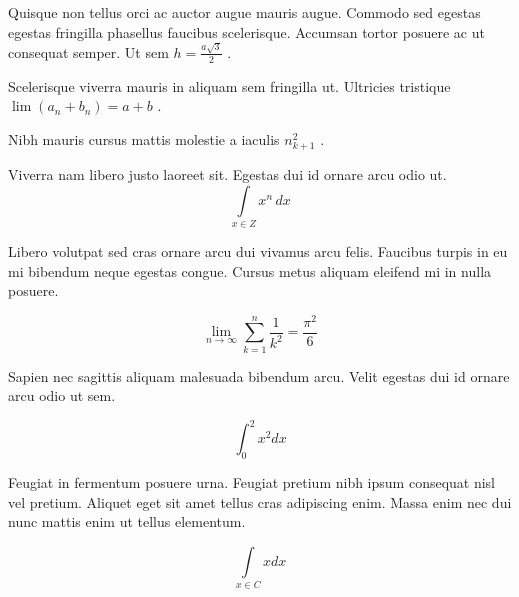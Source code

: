 \documentclass{article}
\begin{document}
Quisque non tellus orci ac auctor augue mauris augue. Commodo sed egestas egestas fringilla phasellus faucibus scelerisque. Accumsan tortor posuere ac ut consequat semper. Ut sem 
\begin{math}
	h=\frac{a\sqrt{3}}{2}
\end{math}
.\newline

Scelerisque viverra mauris in aliquam sem fringilla ut. Ultricies tristique 
$ \lim\left ( a_n+b_n \right )=a+b $
.\newline


Nibh mauris cursus mattis molestie a iaculis 
\( n_{k+1}^2 \)
.\newline

Viverra nam libero justo laoreet sit. Egestas dui id ornare arcu odio ut.
\[ \int\limits_{x\in Z}\! x^{n}\, dx \]

Libero volutpat sed cras ornare arcu dui vivamus arcu felis. Faucibus turpis in eu mi bibendum neque egestas congue. Cursus metus aliquam eleifend mi in nulla posuere.

$$ \lim_{n \to \infty}\sum_{k=1}^n \frac{1}{k^2}= \frac{\pi^2}{6} $$

Sapien nec sagittis aliquam malesuada bibendum arcu. Velit egestas dui id ornare arcu odio ut sem. 

\begin{displaymath}
	\int_0^2x^2dx
\end{displaymath}

Feugiat in fermentum posuere urna. Feugiat pretium nibh ipsum consequat nisl vel pretium. Aliquet eget sit amet tellus cras adipiscing enim. Massa enim nec dui nunc mattis enim ut tellus elementum.

\begin{equation}
	\int\limits_{x\in C}xdx
\end{equation}
\end{document}
